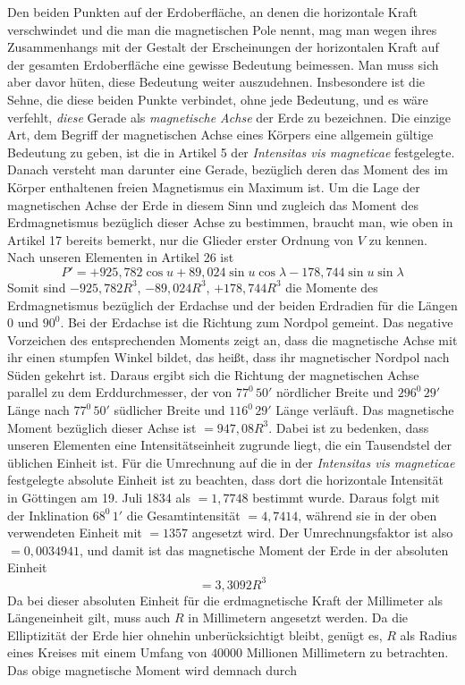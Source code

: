 Den beiden Punkten auf der Erdoberfläche, an denen die horizontale Kraft verschwindet und die man die magnetischen Pole nennt, mag man wegen ihres Zusammenhangs mit der Gestalt der Erscheinungen der horizontalen Kraft auf der gesamten Erdoberfläche eine gewisse Bedeutung beimessen. Man muss sich aber davor hüten, diese Bedeutung weiter auszudehnen. Insbesondere ist die Sehne, die diese beiden Punkte verbindet, ohne jede Bedeutung, und es wäre verfehlt, \textit{diese} Gerade als \textit{magnetische Achse} der Erde zu bezeichnen. Die einzige Art, dem Begriff der magnetischen Achse eines Körpers eine
allgemein gültige Bedeutung zu geben, ist die in Artikel 5 der \textit{Intensitas vis magneticae} festgelegte. Danach versteht man darunter eine Gerade, bezüglich deren das Moment des im Körper enthaltenen freien Magnetismus ein Maximum ist. Um die Lage der magnetischen Achse der Erde in diesem Sinn und zugleich das Moment des Erdmagnetismus bezüglich dieser Achse zu bestimmen, braucht man, wie oben in Artikel 17 bereits bemerkt, nur die Glieder erster Ordnung von $V$ zu kennen. Nach unseren Elementen in Artikel 26 ist
\[
P'=+925{,}782\cos u+89{,}024\sin u\cos\lambda-178{,}744\sin u\sin\lambda
\]
Somit sind $-925{,}782R^3$, $-89{,}024R^3$, $+178{,}744R^3$ die Momente des Erdmagnetismus bezüglich der Erdachse und der beiden Erdradien für die Längen $0$ und $90^0$. Bei der Erdachse ist die Richtung zum Nordpol gemeint. Das negative Vorzeichen des entsprechenden Moments zeigt an, dass die magnetische Achse mit ihr einen stumpfen Winkel bildet, das heißt, dass ihr magnetischer Nordpol nach Süden gekehrt ist. Daraus ergibt sich die Richtung der magnetischen Achse parallel zu dem Erddurchmesser, der von $77^0\,50'$ nördlicher Breite und $296^0\,29'$ Länge nach $77^0\,50'$ südlicher Breite und $116^0\,29'$ Länge verläuft. Das magnetische Moment bezüglich dieser Achse ist $=947{,}08R^3$. Dabei ist zu bedenken, dass unseren Elementen eine Intensitätseinheit zugrunde liegt, die ein Tausendstel der üblichen Einheit ist. Für die Umrechnung auf die in der \textit{Intensitas vis magneticae} festgelegte absolute Einheit ist zu beachten, dass dort die horizontale Intensität in Göttingen am 19. Juli 1834 als $=1{,}7748$ bestimmt wurde. Daraus folgt mit der Inklination $68^0\,1'$ die Gesamtintensität $=4{,}7414$, während sie in der oben verwendeten Einheit mit $=1357$ angesetzt wird. Der Umrechnungsfaktor ist also $=0{,}0034941$, und damit ist das magnetische Moment der Erde in der absoluten Einheit
\[
=3{,}3092R^3
\]
Da bei dieser absoluten Einheit für die erdmagnetische Kraft der Millimeter als Längeneinheit gilt, muss auch $R$ in Millimetern angesetzt werden. Da die Elliptizität der Erde hier ohnehin unberücksichtigt bleibt, genügt es, $R$ als Radius eines Kreises mit einem Umfang von $40000$ Millionen Millimetern zu betrachten. Das obige magnetische Moment wird demnach durch
